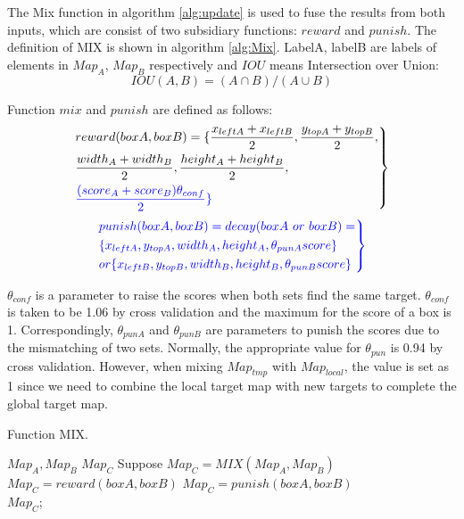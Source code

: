 \documentclass[conference]{IEEEtran}
\begin{document}
The Mix function in algorithm \ref{alg:update} is used to fuse the results from both inputs, which are consist of two subsidiary functions: $reward$ and $punish$. The definition of MIX is shown in algorithm \ref{alg:Mix}. LabelA, labelB are labels of elements  in $Map_{A}$, $Map_{B}$ respectively  and $IOU$  means Intersection over Union:\\
\begin{equation}
IOU(A,B)= (A \cap  B) / (A\cup  B)
\end{equation} 

Function $mix$ and $punish$  are defined as follows:
\begin{equation}
\left.\begin{aligned}
&reward(boxA,boxB)= \{\frac {x_{leftA}+x_{leftB}}{2},\frac {y_{topA}+y_{topB}}{2},\\
&\frac {width_{A}+width_{B}}{2},\frac {height_{A}+height_{B}}{2},\\
&{\color{blue}\frac {(score_{A}+score_{B})\theta_{conf}}{2}\}}
       \end{aligned}
\right\}
\end{equation}
\begin{equation}
\color{blue}
\left.\begin{aligned}
	&punish(boxA,boxB)= decay(boxA\ or\ boxB)= \\
	&\{x_{leftA},y_{topA},width_{A},height_{A},\theta_{punA}score\} \\
	&or \{x_{leftB},y_{topB},width_{B},height_{B},\theta_{punB}score\} 
	\end{aligned} 
\right\}
\end{equation}

$\theta_{conf}$ is a parameter to raise the scores when both sets find the same target. $\theta_{conf}$ is taken to be 1.06  by cross validation and the maximum for the score of a box is 1. Correspondingly, $\theta_{punA}$ and $\theta_{punB}$ are parameters to punish the scores due to the mismatching of two sets. Normally, the appropriate value for $\theta_{pun}$ is 0.94 by cross validation. However, when mixing $Map_{tmp}$ with $Map_{local}$, the value is set as 1 since we need to combine the local target map with new targets to complete the global target map.

\begin{algorithm}[htb]  
	\caption{ Function MIX.}  
	\label{alg:Mix}  
	\begin{algorithmic}[1]  
		\Require 
		$Map_{A},Map_{B}$
		\Ensure  
		$Map_{C}$
		\State Suppose $Map_{C}=MIX(Map_{A},Map_{B})$ 
		\State $Map_{C}=reward(boxA,boxB)$
		\Else 
		\State $Map_{C}=punish(boxA,boxB)$
		\EndIf
		\EndFor\\
		\Return 	$Map_{C}$; 
	\end{algorithmic}  
\end{algorithm} 
\end{document}
